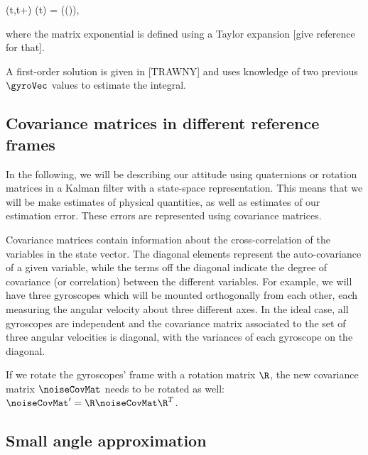 \begin{equations}
\thetaMat(t,t+\Deltat) \equiv \thetaMat(\Delta t) = \exp\left(\matOmega(\gyroVec)\Deltat\right),
\label{eq:quaternionIntegration}
\end{equations}
where the matrix exponential is defined using a Taylor expansion [give reference for that]. 


A first-order solution is given in [TRAWNY] and uses knowledge of two previous $\gyroVec$ values to estimate the integral.

\subsection{Covariance matrices in different reference frames}
In the following, we will be describing our attitude using quaternions or rotation matrices in a Kalman filter with a state-space representation. This means that we will be make estimates of physical quantities, as well as estimates of our estimation error. These errors are represented using covariance matrices. 

Covariance matrices contain information about the cross-correlation of the variables in the state vector. The diagonal elements represent the auto-covariance of a given variable, while the terms off the diagonal indicate the degree of covariance (or correlation) between the different variables. For example, we will have three gyroscopes which will be mounted orthogonally from each other, each measuring the angular velocity about three different axes. In the ideal case, all gyroscopes are independent and the covariance matrix associated to the set of three angular velocities is diagonal, with the variances of each gyroscope on the diagonal.

If we rotate the gyroscopes' frame with a rotation matrix $\R$, the new covariance matrix $\noiseCovMat$ needs to be rotated as well: $\noiseCovMat' = \R\noiseCovMat\R^T$. 

\subsection{Small angle approximation}

